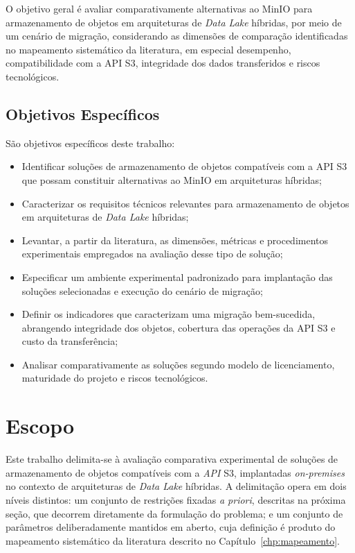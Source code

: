 O objetivo geral é avaliar comparativamente alternativas ao MinIO para armazenamento
de objetos em arquiteturas de \textit{Data Lake} híbridas, por meio de um cenário
de migração, considerando as dimensões de comparação identificadas no mapeamento
sistemático da literatura, em especial desempenho, compatibilidade com a API S3,
integridade dos dados transferidos e riscos tecnológicos.

\subsection{Objetivos Específicos}
\label{sec:objetivos-especificos}

São objetivos específicos deste trabalho:

\begin{itemize}
    \item Identificar soluções de armazenamento de objetos compatíveis com a API S3
          que possam constituir alternativas ao MinIO em arquiteturas híbridas;
    \item Caracterizar os requisitos técnicos relevantes para armazenamento de
          objetos em arquiteturas de \textit{Data Lake} híbridas;
    \item Levantar, a partir da literatura, as dimensões, métricas e procedimentos
          experimentais empregados na avaliação desse tipo de solução;
    \item Especificar um ambiente experimental padronizado para implantação das
          soluções selecionadas e execução do cenário de migração;
    \item Definir os indicadores que caracterizam uma migração bem-sucedida,
          abrangendo integridade dos objetos, cobertura das operações da API S3 e
          custo da transferência;
    \item Analisar comparativamente as soluções segundo modelo de licenciamento,
          maturidade do projeto e riscos tecnológicos.
\end{itemize}

\section{Escopo}
\label{sec:escopo}

Este trabalho delimita-se à avaliação comparativa experimental de soluções de
armazenamento de objetos compatíveis com a \textit{API} S3, implantadas
\textit{on-premises} no contexto de arquiteturas de \textit{Data Lake} híbridas.
A delimitação opera em dois níveis distintos: um conjunto de restrições fixadas
\textit{a priori}, descritas na próxima seção, que decorrem diretamente da
formulação do problema; e um conjunto de parâmetros deliberadamente mantidos em
aberto, cuja definição é produto do mapeamento sistemático da literatura descrito
no Capítulo~\ref{chp:mapeamento}.

